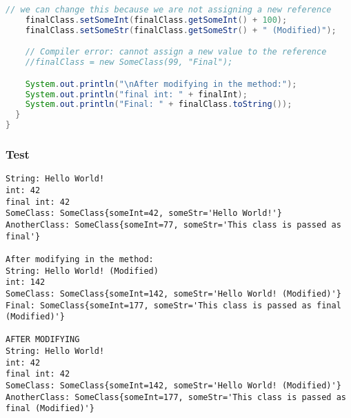 \begin{lstlisting}[language=Java]
    // we can change this because we are not assigning a new reference
    finalClass.setSomeInt(finalClass.getSomeInt() + 100);
    finalClass.setSomeStr(finalClass.getSomeStr() + " (Modified)");

    // Compiler error: cannot assign a new value to the reference
    //finalClass = new SomeClass(99, "Final");

    System.out.println("\nAfter modifying in the method:");
    System.out.println("final int: " + finalInt);
    System.out.println("Final: " + finalClass.toString());
  }
}
\end{lstlisting}

\subsubsection{Test}\label{App:AppendixLResults}
\begin{lstlisting}
String: Hello World!
int: 42
final int: 42
SomeClass: SomeClass{someInt=42, someStr='Hello World!'}
AnotherClass: SomeClass{someInt=77, someStr='This class is passed as final'}

After modifying in the method:
String: Hello World! (Modified)
int: 142
SomeClass: SomeClass{someInt=142, someStr='Hello World! (Modified)'}
Final: SomeClass{someInt=177, someStr='This class is passed as final (Modified)'}

AFTER MODIFYING
String: Hello World!
int: 42
final int: 42
SomeClass: SomeClass{someInt=142, someStr='Hello World! (Modified)'}
AnotherClass: SomeClass{someInt=177, someStr='This class is passed as final (Modified)'}
\end{lstlisting}